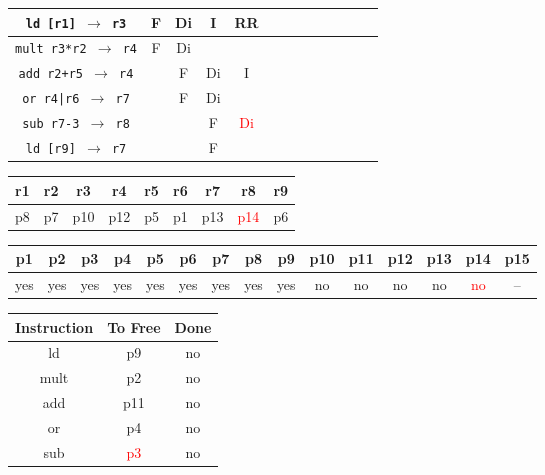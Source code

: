 \documentclass[12pt]{article}
\begin{document}
\begin{enumerate}
\begin{table}[H]
\begin{tabular}{|c|c|c|c|c|c|c|c|c|c|c|c|c|}
					\hline
					\texttt{ld [r1] $\rightarrow$ r3} & F & Di & I & RR &  &  &  &  &  &  &  &\\
					\hline
					\texttt{mult r3*r2 $\rightarrow$ r4} & F & Di &  &  &  &  &  &  &  &  &  &\\
					\hline
					\texttt{add r2+r5 $\rightarrow$ r4} &  & F & Di & I &  &  &  &  &  &  &  &\\
					\hline
					\texttt{or r4|r6 $\rightarrow$ r7} &  & F & Di &  &  &  &  &  &  &  &  &\\
					\hline
					\texttt{sub r7-3 $\rightarrow$ r8} &  &  & F & \textcolor{red}{Di} &  &  &  &  &  &  &  &\\
					\hline
					\texttt{ld [r9] $\rightarrow$ r7} &  &  & F &  &  &  &  &  &  &  &  &\\
					\hline 
				\end{tabular}
			\end{table}
			\begin{table}[H]
				\begin{tabular}{|c|c|c|c|c|c|c|c|c|}
					\hline
					r1 & r2 & r3 & r4 & r5 & r6 & r7 & r8 & r9\\
					\hline
					p8 & p7 & p10 & p12 & p5 & p1 & p13 & \textcolor{red}{p14} & p6\\
					\hline
				\end{tabular}
			\end{table}
			\begin{table}[H]
				\begin{tabular}{|c|c|c|c|c|c|c|c|c|c|c|c|c|c|c|}
					\hline
					p1 & p2 & p3 & p4 & p5 & p6 & p7 & p8 & p9 & p10 & p11 & p12 & p13 & p14 & p15\\
					\hline
					yes & yes & yes & yes & yes & yes & yes & yes & yes & no & no & no & no & \textcolor{red}{no} & --\\
					\hline
				\end{tabular}
			\end{table}
			\begin{table}[H]
				\begin{tabular}{|c|c|c|}
					\hline
					Instruction & To Free & Done\\
					\hline
					ld & p9 & no\\
					\hline
					mult & p2 & no\\
					\hline
					add & p11 & no\\
					\hline
					or & p4 & no\\
					\hline
					sub & \textcolor{red}{p3} & no\\

\end{tabular}
\end{table}
\end{enumerate}
\end{document}
